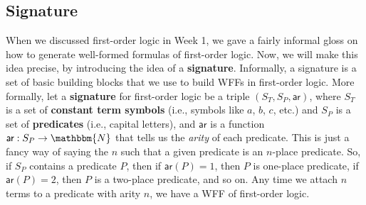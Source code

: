 \documentclass[11pt]{article}
\theoremstyle{definition}
\theoremstyle{remark}
\begin{document}
\subsection{Signature}
When we discussed first-order logic in Week 1, we gave a fairly informal gloss on how to generate well-formed formulas of first-order logic. Now, we will make this idea precise, by introducing the idea of a \textbf{signature}. Informally, a signature is a set of basic building blocks that we use to build WFFs in first-order logic. More formally, let a \textbf{signature} for first-order logic be a triple $(S_{T},S_{P},\textsf{ar})$, where $S_{T}$ is a set of \textbf{constant term symbols} (i.e., symbols like $a$, $b$, $c$, etc.) and $S_{P}$ is a set of \textbf{predicates} (i.e., capital letters), and $\textsf{ar}$ is a function $\textsf{ar}:S_{P}\rightarrow\mathbbm{N}$ that tells us the \textit{arity} of each predicate. This is just a fancy way of saying the $n$ such that a given predicate is an $n$-place predicate. So, if $S_{P}$ contains a predicate $P$, then if $\textsf{ar}(P)=1$, then $P$ is one-place predicate, if $\textsf{ar}(P)=2$, then $P$ is a two-place predicate, and so on. Any time we attach $n$ terms to a predicate with arity $n$, we have a WFF of first-order logic.
\end{document}
